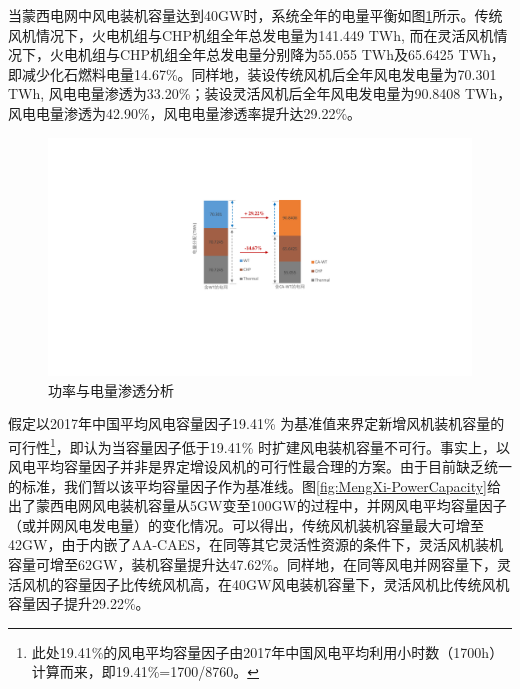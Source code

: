 当蒙西电网中风电装机容量达到40GW时，系统全年的电量平衡如图\ref{fig:MengXi-Penetration}所示。传统风机情况下，火电机组与CHP机组全年总发电量为141.449 TWh, 而在灵活风机情况下，火电机组与CHP机组全年总发电量分别降为55.055 TWh及65.6425 TWh，即减少化石燃料电量14.67\%。同样地，装设传统风机后全年风电发电量为70.301 TWh, 风电电量渗透为33.20\%；装设灵活风机后全年风电发电量为90.8408 TWh，风电电量渗透为42.90\%，风电电量渗透率提升达29.22\%。

\begin{figure}[H] %
  \centering
  \includegraphics[scale=0.95]{figures/Chap5-14-MengXi-Penetration.pdf}
  \caption{功率与电量渗透分析}
  \label{fig:MengXi-Penetration}
\end{figure}

假定以2017年中国平均风电容量因子19.41\% 为基准值来界定新增风机装机容量的可行性\footnote{此处19.41\%的风电平均容量因子由2017年中国风电平均利用小时数（1700h）计算而来，即19.41\%=1700/8760。}，即认为当容量因子低于19.41\% 时扩建风电装机容量不可行。事实上，以风电平均容量因子并非是界定增设风机的可行性最合理的方案。由于目前缺乏统一的标准，我们暂以该平均容量因子作为基准线。图\ref{fig:MengXi-PowerCapacity}给出了蒙西电网风电装机容量从5GW变至100GW的过程中，并网风电平均容量因子（或并网风电发电量）的变化情况。可以得出，传统风机装机容量最大可增至42GW，由于内嵌了AA-CAES，在同等其它灵活性资源的条件下，灵活风机装机容量可增至62GW，装机容量提升达47.62\%。同样地，在同等风电并网容量下，灵活风机的容量因子比传统风机高，在40GW风电装机容量下，灵活风机比传统风机容量因子提升29.22\%。

